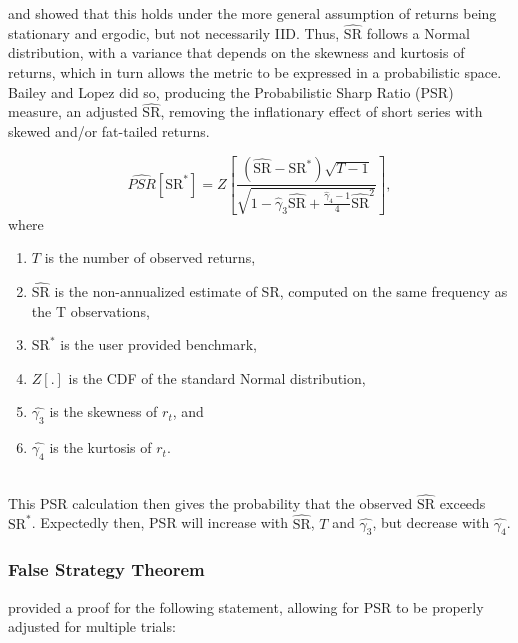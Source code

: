 \documentclass[a4paper,11pt,oneside]{article}
\theoremstyle{plain}
\theoremstyle{definition}
\begin{document}
	\citet{Christie} and \citet{Opdyke} showed that this holds under the more general assumption of returns being stationary and ergodic, but not necessarily IID. Thus, $\widehat{\mathrm{SR}}$ follows a Normal distribution, with a variance that depends on the skewness and kurtosis of returns, which in turn allows the metric to be expressed in a probabilistic space. Bailey and Lopez did so, producing the Probabilistic Sharp Ratio (PSR) measure, an adjusted $\widehat{\mathrm{SR}}$, removing the inflationary effect of short series with skewed and/or fat-tailed returns. 
	
	\begin{equation}\label{eq_psr}
	\widehat{P S R}\left[\mathrm{SR}^{*}\right]=Z\left[\frac{\left(\widehat{\mathrm{SR}}-\mathrm{SR}^{*}\right) \sqrt{T-1}}{\sqrt{1-\hat{\gamma}_{3} \widehat{\mathrm{SR}}+\frac{\hat{\gamma}_{4}-1}{4} \widehat{\mathrm{SR}}^{2}}}\right], 
	\end{equation}
	where
	\begin{enumerate}
		\item $T$ is the number of observed returns,
		\item $\widehat{\mathrm{SR}}$ is the non-annualized estimate of SR, computed on the same frequency as the T observations,
		\item $\mathrm{SR}^*$ is the user provided benchmark,
		\item $Z[.]$ is the CDF of the standard Normal distribution,
		\item $\hat{\gamma_3}$ is the skewness of $r_t$, and
		\item $\hat{\gamma_4}$ is the kurtosis of $r_t$.
	\end{enumerate}
	~\\
	This PSR calculation then gives the probability that the observed $\widehat{\mathrm{SR}}$ exceeds $\mathrm{SR}^*$. Expectedly then, PSR will increase with $\widehat{\mathrm{SR}}$, $T$ and $\hat{\gamma_3}$, but decrease with $\hat{\gamma_4}$.
		
	\subsubsection{False Strategy Theorem}\label{imp_fst}
	
	\citet{BaileySharpe} provided a proof for the following statement, allowing for PSR to be properly adjusted for multiple trials:
	
\end{document}
